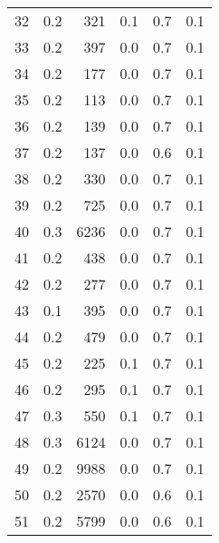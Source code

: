 \begin{tabular}{|r|r|r|r|r|r|}
32 &  0.2 & 321 & 0.1 & 0.7 & 0.1\\
33 &  0.2 & 397 & 0.0 & 0.7 & 0.1\\
34 &  0.2 & 177 & 0.0 & 0.7 & 0.1\\
35 &  0.2 & 113 & 0.0 & 0.7 & 0.1\\
36 &  0.2 & 139 & 0.0 & 0.7 & 0.1\\
37 &  0.2 & 137 & 0.0 & 0.6 & 0.1\\
38 &  0.2 & 330 & 0.0 & 0.7 & 0.1\\
39 &  0.2 & 725 & 0.0 & 0.7 & 0.1\\
40 &  0.3 & 6236 & 0.0 & 0.7 & 0.1\\
41 &  0.2 & 438 & 0.0 & 0.7 & 0.1\\
42 &  0.2 & 277 & 0.0 & 0.7 & 0.1\\
43 &  0.1 & 395 & 0.0 & 0.7 & 0.1\\
44 &  0.2 & 479 & 0.0 & 0.7 & 0.1\\
45 &  0.2 & 225 & 0.1 & 0.7 & 0.1\\
46 &  0.2 & 295 & 0.1 & 0.7 & 0.1\\
47 &  0.3 & 550 & 0.1 & 0.7 & 0.1\\
48 &  0.3 & 6124 & 0.0 & 0.7 & 0.1\\
49 &  0.2 & 9988 & 0.0 & 0.7 & 0.1\\
50 &  0.2 & 2570 & 0.0 & 0.6 & 0.1\\
51 &  0.2 & 5799 & 0.0 & 0.6 & 0.1\\
\hline
\end{tabular}
